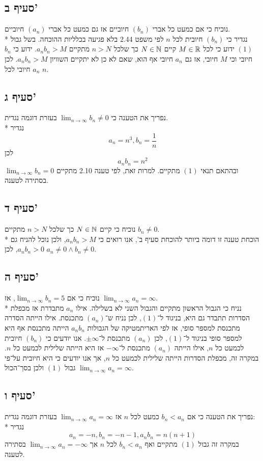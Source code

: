 \subsection{סעיף ב'}
נוכיח כי אם כמעט כל אברי $(b_n)$ חיוביים אז גם כמעט כל אברי $(a_n)$ חיוביים. \\*
נגדיר כי $(b_n)$ חיובית לכל $n$ לפי משפט 2.44 בלא פגיעה בכלליות ההוכחה.
בשל גבול $(1)$ ידוע כי לכל $M \in \mathbb{R}$ קיים $N \in \mathbb{N}$ כך שלכל $n > N$ מתקיים $a_n b_n > M$.
ידוע כי $b_n$ חיובי וכי $M$ חיובי, אז גם $a_n$ חיובי אף הוא, שאם לא כן לא יתקיים השוויון $a_n b_n > M$.
לכן $a_n$ חיובי לכל $n$.

\subsection{סעיף ג'}
נפריך את הטענה כי $\lim_{n \to \infty} b_n \ne 0$ בעזרת דוגמה נגדית. \\*
נגדיר
$$
	a_n = n^3,
	b_n = \frac{1}{n}
$$
לכן
$$
	a_n b_n = n^2
$$
ובהתאם תנאי $(1)$ מתקיים. למרות זאת, לפי טענה 2.10 מתקיים $\lim_{n \to \infty} b_n = 0$ בסתירה לטענה.

\subsection{סעיף ד'}
נוכיח כי קיים $N \in \mathbb{N}$ כך שלכל $n > N$ מתקיים $b_n \ne 0$. \\*
הוכחת טענה זו דומה ביותר להוכחת סעיף ב', אנו רואים כי $a_n b_n > M$, ולכן נוכל להניח גם $a_n b_n > 0$, לכן $a_n \ne 0 \land b_n \ne 0$.

\subsection{סעיף ה'}
נוכיח כי אם $\lim_{n \to \infty} b_n = 5$, אז $\lim_{n \to \infty} a_n = \infty$. \\*
נניח כי הגבול הראשון מתקיים והגבול השני לא בשלילה.
אילו $a_n$ מתבדרת אז מכפלת הסדרות תתבדר גם היא, בניגוד ל־$(1)$, לכן נניח ש־$(a_n)$ מתכנסת.
אילו הייתה הסדרה מתכנסת למספר סופי, אז לפי האריתמטיקה של הגבולות $a_n b_n$ הייתה מתכנסת אף היא למספר סופי בניגוד ל־$(1)$,
לכן $(a_n)$ מתכנסת ל־$\pm \infty$. אנו יודעים כי $(b_n)$ חיובית לכמעט כל $n$, אילו הייתה $(a_n)$ מתכנסת ל־$-\infty$ אז היא הייתה שלילית לכמעט כל $n$.
במקרה זה, מכפלת הסדרות הייתה שלילית לכמעט כל $n$, אך אנו יודעים כי היא חיובית על־פי גבול $(1)$ ולכן בסך־הכול $\lim_{n \to \infty} a_n = \infty$.

\subsection{סעיף ו'}
נפריך את הטענה כי אם $b_n < a_n$ כמעט לכל $n$ אז $\lim_{n \to \infty} a_n = \infty$ בעזרת דוגמה נגדית: \\*
נגדיר
$$
	a_n = -n, b_n = -n - 1, a_n b_n = n (n + 1)
$$
במקרה זה גבול $(1)$ מתקיים ואף $b_n < a_n$ לכל $n$ אך $\lim_{n \to \infty} a_n = -\infty$ בסתירה לטענה.

